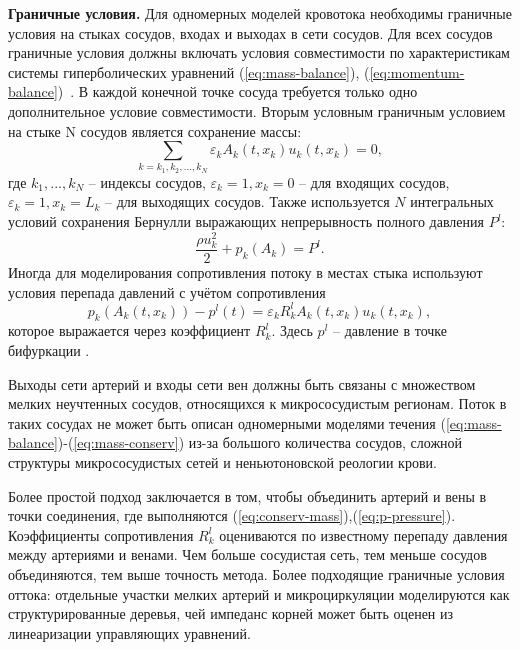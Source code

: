 {\bf Граничные условия.}
Для одномерных моделей кровотока необходимы граничные условия на стыках сосудов, входах и выходах в сети сосудов.
Для всех сосудов граничные условия должны включать условия совместимости по характеристикам системы гиперболических уравнений (\ref{eq:mass-balance}), (\ref{eq:momentum-balance})~\cite{Xiu:2007}.
В каждой конечной точке сосуда требуется только одно дополнительное условие совместимости.
Вторым условным граничным условием на стыке N сосудов является сохранение массы:
\begin{equation}
    \label{eq:conserv-mass}
    \sum_{k=k_1,k_2,...,k_N} \varepsilon_k A_k(t,x_k)u_k(t,x_k)=0,
\end{equation}
где {$k_1,...,k_N$} -- индексы сосудов, $\varepsilon_k=1, x_k=0$ -- для входящих сосудов,
$\varepsilon_k=1, x_k=L_k$ -- для выходящих сосудов.
Также используется $N$ интегральных условий сохранения Бернулли выражающих непрерывность полного давления $P^l$:
\begin{equation}
    \label{eq:bernulli}
    \frac{\rho u^2_k}{2}+{p_k(A_k)}=P^l.
\end{equation}
Иногда для моделирования сопротивления потоку в местах стыка используют условия перепада давлений
с учётом сопротивления
\begin{equation}
    \label{eq:p-pressure}
    p_k\left(A_k\left(t,x_k\right)\right)-p^l(t)=\varepsilon_k R^l_k A_k(t,x_k)u_k(t,x_k),
\end{equation}
которое выражается через коэффициент $R^l_k$. Здесь $p^l$ -- давление в точке бифуркации \cite{bessonov:2014}.


Выходы сети артерий и входы сети вен должны быть связаны с множеством мелких неучтенных сосудов, относящихся к микрососудистым регионам.
 Поток в таких сосудах не может быть описан одномерными моделями течения (\ref{eq:mass-balance})-(\ref{eq:mass-conserv})
 из-за большого количества сосудов, сложной структуры микрососудистых сетей и неньютоновской реологии крови.

Более простой подход заключается в том, чтобы объединить артерий и вены в точки соединения,
где выполняются (\ref{eq:conserv-mass}),(\ref{eq:p-pressure}). Коэффициенты сопротивления $ R^l_k$ оцениваются  по известному перепаду
давления между артериями и венами. Чем больше сосудистая сеть, тем меньше сосудов объединяются, тем выше точность метода.
Более подходящие граничные условия оттока: отдельные участки мелких артерий и микроциркуляции моделируются как структурированные деревья,
чей импеданс корней может быть оценен из линеаризации управляющих уравнений.

